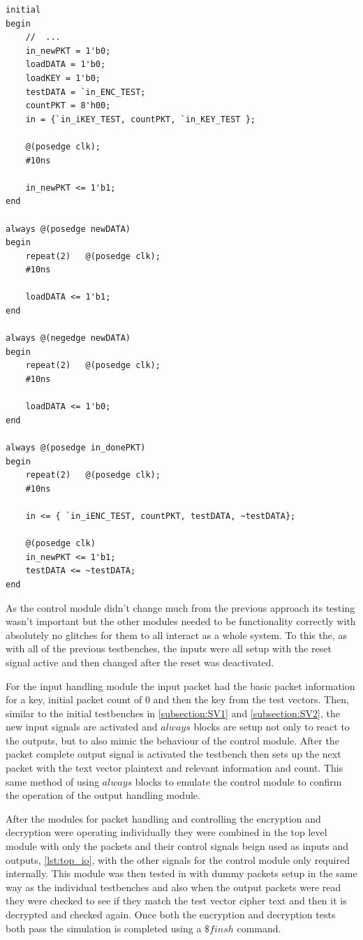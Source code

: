 \documentclass[12pt,twoside,a4paper]{report}
\begin{document}
 	\begin{minipage}{\linewidth}
	\begin{lstlisting}[label={lst:test_dataIN},caption={The testbench for the input packet handling module.},style=SVStyle]
initial
begin
	//	...
	in_newPKT = 1'b0;
	loadDATA = 1'b0;
	loadKEY = 1'b0;
	testDATA = `in_ENC_TEST;
	countPKT = 8'h00;
	in = {`in_iKEY_TEST, countPKT, `in_KEY_TEST };

	@(posedge clk);
	#10ns
	
	in_newPKT <= 1'b1;
end

always @(posedge newDATA)
begin
	repeat(2)	@(posedge clk);
	#10ns
	
	loadDATA <= 1'b1;
end

always @(negedge newDATA)
begin
	repeat(2)	@(posedge clk);
	#10ns
	
	loadDATA <= 1'b0;
end

always @(posedge in_donePKT)
begin
	repeat(2)	@(posedge clk);
	#10ns

	in <= { `in_iENC_TEST, countPKT, testDATA, ~testDATA};
	
	@(posedge clk)
	in_newPKT <= 1'b1;
	testDATA <= ~testDATA;
end
	\end{lstlisting}
	\end{minipage}
	
	As the control module didn't change much from the previous approach its testing wasn't important but the other modules needed to be functionality correctly with absolutely no glitches for them to all interact as a whole system. To this the, as with all of the previous testbenches, the inputs were all setup with the reset signal active and then changed after the reset was deactivated.

	For the input handling module the input packet had the basic packet information for a key, initial packet count of $0$ and then the key from the test vectors. Then, similar to the initial testbenches in \autoref{subsection:SV1} and \ref{subsection:SV2}, the new input signals are activated and $always$ blocks are setup not only to react to the outputs, but to also mimic the behaviour of the control module. After the packet complete output signal is activated the testbench then sets up the next packet with the text vector plaintext and relevant information and count. This same method of using $always$ blocks to emulate the control module to confirm the operation of the output handling module.
	
	After the modules for packet handling and controlling the encryption and decryption were operating individually they were combined in the top level module with only the packets and their control signals beign used as inputs and outputs, \autoref{lst:top_io}, with the other signals for the control module only required internally. This module was then tested in with dummy packets setup in the same way as the individual testbenches and also when the output packets were read they were checked to see if they match the test vector cipher text and then it is decrypted and checked again. Once both the encryption and decryption tests both pass the simulation is completed using a $\$finsh$ command.
\end{document}
